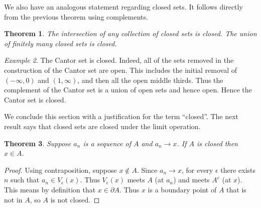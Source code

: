 \documentclass[11pt,oneside]{amsbook}
\theoremstyle{definition}
\theoremstyle{plain}
\newtheorem{thm}{Theorem}[section]
\theoremstyle{definition}
\theoremstyle{remark}
\newtheorem{example}[thm]{Example}
\numberwithin{equation}{section}
\numberwithin{figure}{section}
\begin{document}
We also have an analogous statement regarding closed sets. It follows directly from the previous theorem using complements.

\begin{thm}
  The intersection of any collection of closed sets is closed. The union of finitely many closed sets is closed.
\end{thm}

\begin{example}
  The Cantor set is closed. Indeed, all of the sets removed in the construction of the Cantor set are open. This includes the initial removal of $(-\infty,0)$ and $(1,\infty)$, and then all the open middle thirds. Thus the complement of the Cantor set is a union of open sets and hence open. Hence the Cantor set is closed.
\end{example}

We conclude this section with a justification for the term ``closed''. The next result says that closed sets are closed under the limit operation.

\begin{thm}
  Suppose $a_n$ is a sequence of $A$ and $a_n\to x$. If $A$ is closed then $x\in A$.
\end{thm}

\begin{proof}
  Using contraposition, suppose $x\notin A$. Since $a_n\to x$, for every $\epsilon$ there exists $n$ such that $a_n\in V_\epsilon(x)$. Thus $V_\epsilon(x)$ meets $A$ (at $a_n$) and meets $A^c$ (at $x$). This means by definition that $x\in\partial A$. Thus $x$ is a boundary point of $A$ that is not in $A$, so $A$ is not closed.
\end{proof}
\end{document}
